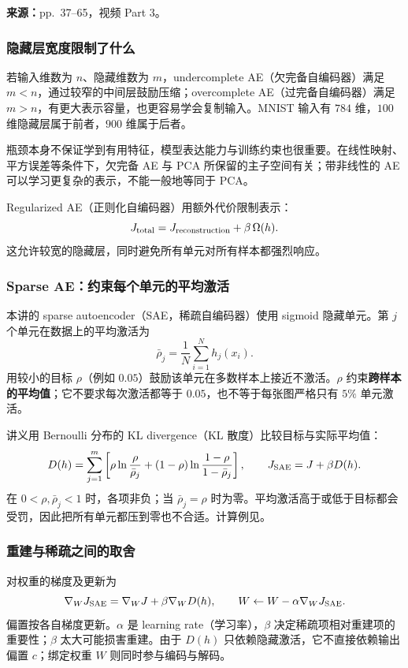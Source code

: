 
\textbf{来源：}pp.~37--65，视频 Part 3。

\subsubsection{隐藏层宽度限制了什么}

若输入维数为 $n$、隐藏维数为 $m$，undercomplete AE（欠完备自编码器）满足 $m<n$，通过较窄的中间层鼓励压缩；overcomplete AE（过完备自编码器）满足 $m>n$，有更大表示容量，也更容易学会复制输入。MNIST 输入有 $784$ 维，$100$ 维隐藏层属于前者，$900$ 维属于后者。

瓶颈本身不保证学到有用特征，模型表达能力与训练约束也很重要。在线性映射、平方误差等条件下，欠完备 AE 与 PCA 所保留的主子空间有关；带非线性的 AE 可以学习更复杂的表示，不能一般地等同于 PCA。

Regularized AE（正则化自编码器）用额外代价限制表示：
\[
 J_{\rm total}=J_{\rm reconstruction}+\beta\,\Omega(h).
\]
这允许较宽的隐藏层，同时避免所有单元对所有样本都强烈响应。

\subsubsection{Sparse AE：约束每个单元的平均激活}

本讲的 sparse autoencoder（SAE，稀疏自编码器）使用 sigmoid 隐藏单元。第 $j$ 个单元在数据上的平均激活为
\[
 \bar\rho_j=\frac1N\sum_{i=1}^N h_j(x_i).
\]
用较小的目标 $\rho$（例如 $0.05$）鼓励该单元在多数样本上接近不激活。$\rho$ 约束\textbf{跨样本的平均值}；它不要求每次激活都等于 $0.05$，也不等于每张图严格只有 $5\%$ 单元激活。

讲义用 Bernoulli 分布的 KL divergence（KL 散度）比较目标与实际平均值：
\[
 D(h)=\sum_{j=1}^{m}\left[
 \rho\ln\frac{\rho}{\bar\rho_j}
 +(1-\rho)\ln\frac{1-\rho}{1-\bar\rho_j}\right],
 \qquad J_{\rm SAE}=J+\beta D(h).
\]
在 $0<\rho,\bar\rho_j<1$ 时，各项非负；当 $\bar\rho_j=\rho$ 时为零。平均激活高于或低于目标都会受罚，因此把所有单元都压到零也不合适。计算例见。

\subsubsection{重建与稀疏之间的取舍}

对权重的梯度及更新为
\[
 \nabla_W J_{\rm SAE}=\nabla_W J+\beta\nabla_W D(h),
 \qquad W\leftarrow W-\alpha\nabla_W J_{\rm SAE}.
\]
偏置按各自梯度更新。$\alpha$ 是 learning rate（学习率），$\beta$ 决定稀疏项相对重建项的重要性；$\beta$ 太大可能损害重建。由于 $D(h)$ 只依赖隐藏激活，它不直接依赖输出偏置 $c$；绑定权重 $W$ 则同时参与编码与解码。

